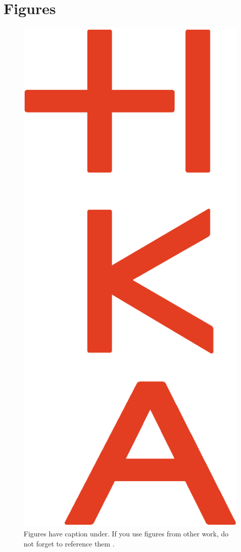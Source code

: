\section{Figures}
\begin{figure}[H]
    \centering
    \includegraphics[height=0.8\textheight]{logos/HKA_Bildmarke-v_CMYK}
    \caption{Figures have caption under. If you use figures from other work, do not forget to reference them \cite{deininger2005studien}.}
    \label{fig:figure_caption}
\end{figure}

